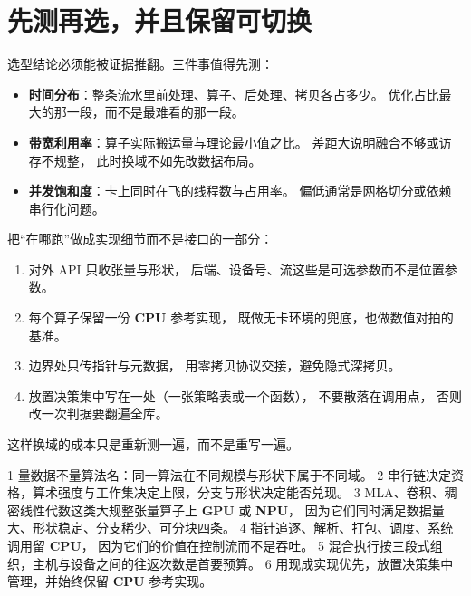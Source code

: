 \documentclass[12pt,a4paper,fontset=fandol]{ctexbook}
\newcommand{\Dom}[1]{\textsf{\bfseries #1}}
\newcommand{\CPU}{\Dom{CPU}}
\newcommand{\GPU}{\Dom{GPU}}
\newcommand{\NPU}{\Dom{NPU}}
\begin{document}
\section{先测再选，并且保留可切换}

选型结论必须能被证据推翻。三件事值得先测：

\begin{itemize}
  \item \textbf{时间分布}：整条流水里前处理、算子、后处理、拷贝各占多少。
        优化占比最大的那一段，而不是最难看的那一段。
  \item \textbf{带宽利用率}：算子实际搬运量与理论最小值之比。
        差距大说明融合不够或访存不规整，
        此时换域不如先改数据布局。
  \item \textbf{并发饱和度}：卡上同时在飞的线程数与占用率。
        偏低通常是网格切分或依赖串行化问题。
\end{itemize}

\begin{bestpractice}[title={让放置可以改主意}]
把``在哪跑''做成实现细节而不是接口的一部分：
\begin{enumerate}
  \item 对外 API 只收张量与形状，
        后端、设备号、流这些是可选参数而不是位置参数。
  \item 每个算子保留一份 \CPU{} 参考实现，
        既做无卡环境的兜底，也做数值对拍的基准。
  \item 边界处只传指针与元数据，
        用零拷贝协议交接，避免隐式深拷贝。
  \item 放置决策集中写在一处（一张策略表或一个函数），
        不要散落在调用点，
        否则改一次判据要翻遍全库。
\end{enumerate}
这样换域的成本只是重新测一遍，而不是重写一遍。
\end{bestpractice}

\begin{guideline}[title={本章的判断口径}]
1 量数据不量算法名：同一算法在不同规模与形状下属于不同域。
2 串行链决定资格，算术强度与工作集决定上限，分支与形状决定能否兑现。
3 MLA、卷积、稠密线性代数这类大规整张量算子上 \GPU{} 或 \NPU{}，
  因为它们同时满足数据量大、形状稳定、分支稀少、可分块四条。
4 指针追逐、解析、打包、调度、系统调用留 \CPU{}，
  因为它们的价值在控制流而不是吞吐。
5 混合执行按三段式组织，主机与设备之间的往返次数是首要预算。
6 用现成实现优先，放置决策集中管理，并始终保留 \CPU{} 参考实现。
\end{guideline}
\end{document}
